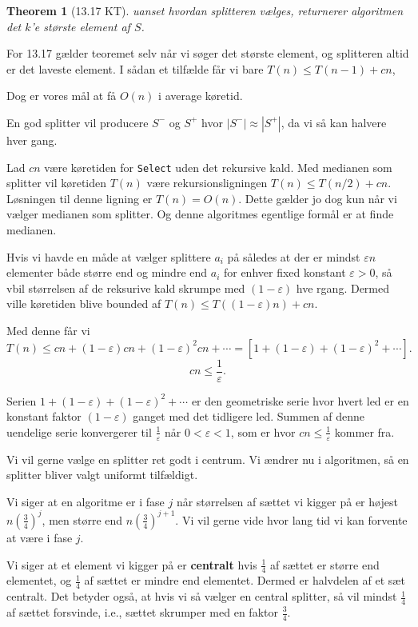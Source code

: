 \documentclass[11pt]{article}
\newtheorem{theorem}{Theorem}
\theoremstyle{definition}
\theoremstyle{remark}
\begin{document}
\begin{theorem}[13.17 KT]
uanset hvordan splitteren vælges, returnerer algoritmen det $k$'e største element af  $S$.
\end{theorem}

For 13.17 gælder teoremet selv når vi søger det største element, og splitteren altid er det laveste element. I sådan et tilfælde får vi bare $T(n) \leq T(n-1)+cn$, 

Dog er vores mål at få $O(n)$ i average køretid. 


En god splitter vil producere $S^{-}$ og $S^{+}$ hvor $|S^{-}| \approx |S^{+}|$, da vi så kan halvere hver gang.

Lad $cn$ være køretiden for \texttt{Select} uden det rekursive kald. Med medianen som splitter vil køretiden $T(n)$ være rekursionsligningen $T(n) \leq T(n/2) + cn$. Løsningen til denne ligning er $T(n) = O(n)$. Dette gælder jo dog kun når vi vælger medianen som splitter. Og denne algoritmes egentlige formål er at finde medianen. 

Hvis vi havde en måde at vælger splittere $a_{i}$ på således at der er mindst $\varepsilon n$ elementer både større end og mindre end $a_{i}$ for enhver fixed konstant $\varepsilon > 0$, så vbil størrelsen af de reksurive kald skrumpe med $(1- \varepsilon)$ hve rgang. Dermed ville køretiden blive bounded af $T(n) \leq T((1 - \varepsilon) n) + cn$.

Med denne får vi
\[
T(n) \leq cn + (1- \varepsilon)cn + (1 - \varepsilon)^{2}cn + \cdots = [1 + (1- \varepsilon) + (1 - \varepsilon)^{2} + \cdots].
\]
\[
cn \leq \frac{1}{\varepsilon}.
\]

Serien $1 + (1 - \varepsilon) + (1 - \varepsilon)^{2} + \cdots$ er den geometriske serie hvor hvert led er en konstant faktor $(1 - \varepsilon)$ ganget med det tidligere led. Summen af denne uendelige serie konvergerer til $\frac{1}{\varepsilon}$ når $0 < \varepsilon < 1$, som er hvor $cn \leq \frac{1}{\varepsilon}$ kommer fra. 

Vi vil gerne vælge en splitter ret godt i centrum. Vi ændrer nu i algoritmen, så en splitter bliver valgt uniformt tilfældigt.

Vi siger at en algoritme er i fase $j$ når størrelsen af sættet vi kigger på er højest $ n \left( \frac{3}{4} \right)^{j} $, men større end $n  \left( \frac{3}{4} \right)^{j+1}$. Vi vil gerne vide hvor lang tid vi kan forvente at være i fase $j$.

Vi siger at et element vi kigger på er \textbf{centralt} hvis $\frac{1}{4}$ af sættet er større end elementet, og $\frac{1}{4}$ af sættet er mindre end elementet. Dermed er halvdelen af et sæt centralt. Det betyder også, at hvis vi så vælger en central splitter, så vil mindst $\frac{1}{4}$ af sættet forsvinde, i.e., sættet skrumper med en faktor $\frac{3}{4}$.
\end{document}
